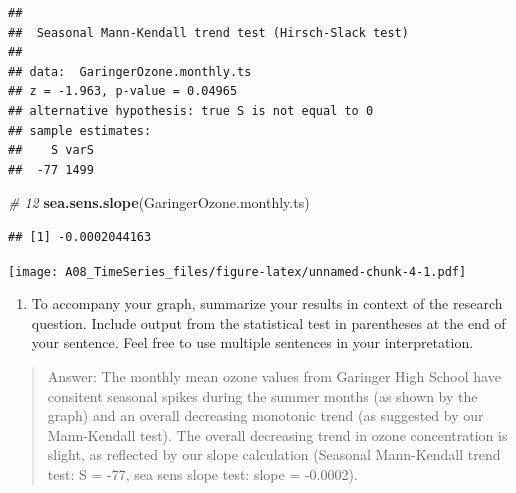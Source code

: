 \documentclass[]{article}
\newenvironment{Shaded}{\begin{snugshade}}{\end{snugshade}}
\newcommand{\CommentTok}[1]{\textcolor[rgb]{0.56,0.35,0.01}{\textit{#1}}}
\newcommand{\DataTypeTok}[1]{\textcolor[rgb]{0.13,0.29,0.53}{#1}}
\newcommand{\FloatTok}[1]{\textcolor[rgb]{0.00,0.00,0.81}{#1}}
\newcommand{\KeywordTok}[1]{\textcolor[rgb]{0.13,0.29,0.53}{\textbf{#1}}}
\newcommand{\NormalTok}[1]{#1}
\newcommand{\OperatorTok}[1]{\textcolor[rgb]{0.81,0.36,0.00}{\textbf{#1}}}
\newcommand{\StringTok}[1]{\textcolor[rgb]{0.31,0.60,0.02}{#1}}
\providecommand{\tightlist}{%
  \setlength{\itemsep}{0pt}\setlength{\parskip}{0pt}}
\begin{document}
\begin{verbatim}
## 
##  Seasonal Mann-Kendall trend test (Hirsch-Slack test)
## 
## data:  GaringerOzone.monthly.ts
## z = -1.963, p-value = 0.04965
## alternative hypothesis: true S is not equal to 0
## sample estimates:
##    S varS 
##  -77 1499
\end{verbatim}

\begin{Shaded}
\begin{Highlighting}[]
\CommentTok{# 12}
\KeywordTok{sea.sens.slope}\NormalTok{(GaringerOzone.monthly.ts)}
\end{Highlighting}
\end{Shaded}

\begin{verbatim}
## [1] -0.0002044163
\end{verbatim}

\begin{Shaded}
\end{Shaded}

\texttt{[image: A08\_TimeSeries\_files/figure-latex/unnamed-chunk-4-1.pdf]}

\begin{enumerate}
\def\labelenumi{\arabic{enumi}.}
\setcounter{enumi}{13}
\tightlist
\item
  To accompany your graph, summarize your results in context of the
  research question. Include output from the statistical test in
  parentheses at the end of your sentence. Feel free to use multiple
  sentences in your interpretation.
\end{enumerate}

\begin{quote}
Answer: The monthly mean ozone values from Garinger High School have
consitent seasonal spikes during the summer months (as shown by the
graph) and an overall decreasing monotonic trend (as suggested by our
Mann-Kendall test). The overall decreasing trend in ozone concentration
is slight, as reflected by our slope calculation (Seasonal Mann-Kendall
trend test: S = -77, sea sens slope test: slope = -0.0002).
\end{quote}
\end{document}
